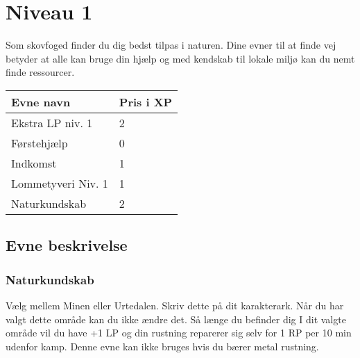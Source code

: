 \chapter{Niveau 1}

Som skovfoged finder du dig bedst tilpas i naturen. Dine evner til at finde vej betyder at alle kan bruge din hjælp og med kendskab til lokale miljø kan du nemt finde ressourcer.

\begin{table}[H]
    \centering
    \begin{tabular}{|p{}|p{}|}
    \rowcolor{cerulean!80}\hline
        Evne navn & Pris i XP \\\hline
        Ekstra LP niv. 1 &2\\\hline 
        Førstehjælp & 0 \\\hline
        Indkomst & 1\\\hline
        Lommetyveri Niv. 1 &1\\\hline
        Naturkundskab &2\\\hline
    \end{tabular}
\end{table}

\section{Evne beskrivelse}









\subsection{Naturkundskab}
Vælg mellem Minen eller Urtedalen. Skriv dette på dit karakterark. Når du har valgt dette område kan du ikke ændre det. Så længe du befinder dig I dit valgte område vil du have +1 LP og din rustning reparerer sig selv for 1 RP per 10 min udenfor kamp. Denne evne kan ikke bruges hvis du bærer metal rustning.